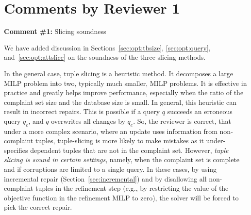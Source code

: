 
\section*{Comments by Reviewer 1}

\noindent
\textbf{Comment \#1:} Slicing soundness
\begin{quote}
\end{quote}

We have added discussion in Sections~\ref{sec:opt:tbsize},
\ref{sec:opt:query}, and~\ref{sec:opt:attslice} on the soundness of the three
slicing methods.   


In the general case, tuple slicing is a heuristic method. It decomposes a
large MILP problem into two, typically much smaller, MILP problems. It is
effective in practice and greatly helps improve \sys performance, especially
when the ratio of the complaint set size and the database size is small. In
general, this heuristic can result in incorrect repairs. This is possible if a
query $q$ succeeds an erroneous query $q_e$, and $q$ overwrites all changes by
$q_e$. So, the reviewer is correct, that under a more complex scenario, where
an update uses information from non-complaint tuples, tuple-slicing is more
likely to make mistakes as it under-specifies dependent tuples that are not in
the complaint set.
However, \emph{tuple slicing is sound in certain settings}, namely,
when the complaint set is complete and if corruptions are limited to a single
query. In these cases, by using incremental repair
(Section~\ref{sec:incremental}) and by disallowing all non-complaint tuples in
the refinement step (e.g., by restricting the value of the objective function
in the refinement MILP to zero), the solver will be forced to pick the correct
repair.

